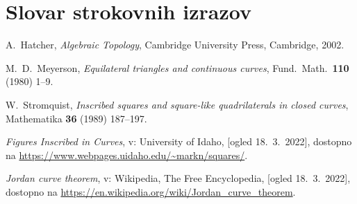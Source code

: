 \documentclass[mat1]{fmfdelo}
\begin{document}
\section*{Slovar strokovnih izrazov}

\geslo{}{}
\geslo{}{}

\begin{thebibliography}{99}

A.~Hatcher, \emph{Algebraic Topology}, Cambridge University Press, Cambridge, 2002.

M.~D.~Meyerson, \emph{Equilateral triangles and continuous curves}, Fund.\ Math.\ \textbf{110} (1980) 1--9.

W.~Stromquist, \emph{Inscribed squares and square-like quadrilaterals in closed curves}, Mathematika \textbf{36} (1989) 187--197.

\emph{Figures Inscribed in Curves}, v: University of Idaho, [ogled 18.~3.~2022], dostopno na \url{https://www.webpages.uidaho.edu/~markn/squares/}.

\emph{Jordan curve theorem}, v: Wikipedia, The Free Encyclopedia, [ogled 18.~3.~2022], dostopno na \url{https://en.wikipedia.org/wiki/Jordan_curve_theorem}.

\end{thebibliography}
\end{document}
